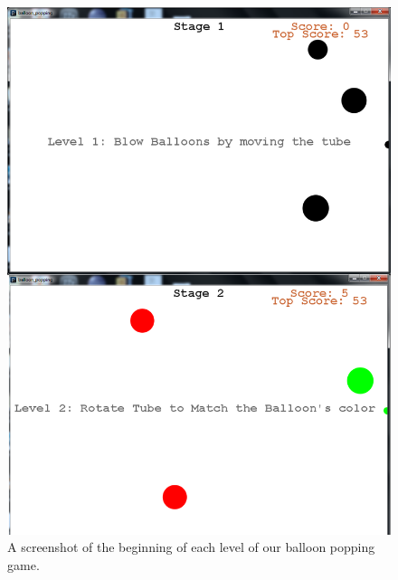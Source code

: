 \begin{figure}
  \centering
  \includegraphics[width=0.8\linewidth]{./figs/tubemaster.png}
  \caption{A screenshot of the beginning of each level of our balloon popping game.}
  \label{fig:shooting-game}
\end{figure}


